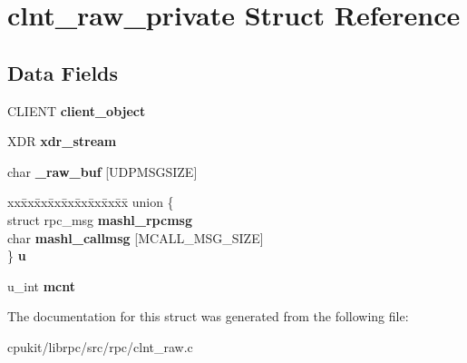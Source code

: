\hypertarget{structclnt__raw__private}{}\section{clnt\+\_\+raw\+\_\+private Struct Reference}
\label{structclnt__raw__private}
\subsection*{Data Fields}
\begin{DoxyCompactItemize}
\item 
\mbox{\label{structclnt__raw__private_a6403b4c403fa11796eca0016b79240d7}} 
C\+L\+I\+E\+NT {\bfseries client\+\_\+object}
\item 
\mbox{\label{structclnt__raw__private_a09585c92315a034a353540c04057a5ac}} 
X\+DR {\bfseries xdr\+\_\+stream}
\item 
\mbox{\label{structclnt__raw__private_acd4819d4d10a99816cd732b3741cdb30}} 
char {\bfseries \+\_\+raw\+\_\+buf} \mbox{[}U\+D\+P\+M\+S\+G\+S\+I\+ZE\mbox{]}
\item 
\mbox{\label{structclnt__raw__private_ab455610c766c07a3613c54967078e41c}} 
\begin{tabbing}
xx\=xx\=xx\=xx\=xx\=xx\=xx\=xx\=xx\=\kill
union \{\\
\>struct rpc\_msg {\bfseries mashl\_rpcmsg}\\
\>char {\bfseries mashl\_callmsg} \mbox{[}MCALL\_MSG\_SIZE\mbox{]}\\
\} {\bfseries u}\\

\end{tabbing}\item 
\mbox{\label{structclnt__raw__private_a95934a230e3ab5809c83b184cc17ffaf}} 
u\+\_\+int {\bfseries mcnt}
\end{DoxyCompactItemize}


The documentation for this struct was generated from the following file\+:\begin{DoxyCompactItemize}
\item 
cpukit/librpc/src/rpc/clnt\+\_\+raw.\+c\end{DoxyCompactItemize}
